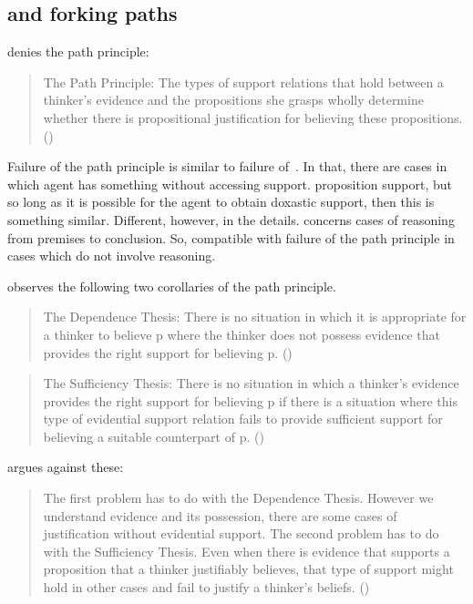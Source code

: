 \subsection{\citeauthor{Littlejohn:2018uq} and forking paths}
\label{sec:littlejohn}

\textcite{Littlejohn:2018uq} denies the path principle:

\begin{quote}
  The Path Principle: The types of support relations that hold between a thinker's evidence and the propositions she grasps wholly determine whether there is propositional justification for believing these propositions.\nolinebreak
  \mbox{}\hfill\mbox{(\citeyear[224]{Littlejohn:2018uq})}
\end{quote}

Failure of the path principle is similar to failure of~\ESU{}.
In that, there are cases in which agent has something without accessing support.
proposition support, but so long as it is possible for the agent to obtain doxastic support, then this is something similar.
Different, however, in the details.
\ESU{} concerns cases of reasoning from premises to conclusion.
So, compatible with failure of the path principle in cases which do not involve reasoning.

\citeauthor{Littlejohn:2018uq} observes the following two corollaries of the path principle.

\begin{quote}
  The Dependence Thesis: There is no situation in which it is appropriate for a thinker to believe p where the thinker does not possess evidence that provides the right support for believing p.\nolinebreak
  \mbox{}\hfill\mbox{(\citeyear[227]{Littlejohn:2018uq})}
\end{quote}

\begin{quote}
  The Sufficiency Thesis: There is no situation in which a thinker's evidence provides the right support for believing p if there is a situation where this type of evidential support relation fails to provide sufficient support for believing a suitable counterpart of p.\nolinebreak
  \mbox{}\hfill\mbox{(\citeyear[227]{Littlejohn:2018uq})}
\end{quote}

\citeauthor{Littlejohn:2018uq} argues against these:

\begin{quote}
  The first problem has to do with the Dependence Thesis.
  However we understand evidence and its possession, there are some cases of justification without evidential support.
  The second problem has to do with the Sufficiency Thesis.
  Even when there is evidence that supports a proposition that a thinker justifiably believes, that type of support might hold in other cases and fail to justify a thinker's beliefs.\nolinebreak
  \mbox{}\hfill\mbox{(\citeyear[227]{Littlejohn:2018uq})}
\end{quote}

